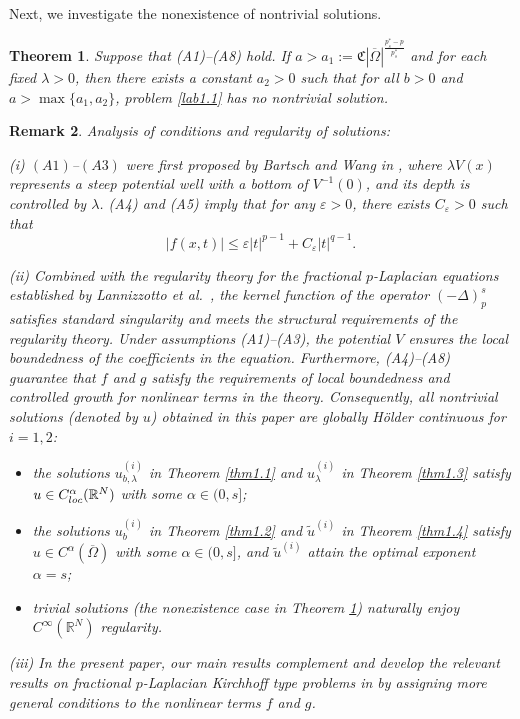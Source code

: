 \documentclass[10pt,a4paper]{amsart}
\numberwithin{equation}{section}
\newtheorem{theorem}{Theorem}[section]
\newtheorem{remark}[theorem]{Remark}
\begin{document}
Next, we investigate the nonexistence of nontrivial solutions.

\begin{theorem} \label{thm1.5}
Suppose that {\rm (A1)--(A8)}  hold.
If $a>a_1:=\mathfrak{C}|\overline{\Omega}|^{\frac{p^*_s-p}{p^*_s}}$ and for each 
fixed $\lambda>0$, then there exists a constant $a_2>0$ such that for all $b>0$ and 
$a>\max\{a_1, a_2\}$, problem \eqref{lab1.1} has no nontrivial solution.
\end{theorem}

\begin{remark}  \label{rmk1.6} \rm
Analysis of conditions and regularity of solutions:

(i) $(A1)$--$(A3)$ were first proposed by Bartsch and Wang in \cite{r2},
where $\lambda V(x)$ represents a steep potential well with a bottom of $V^{-1}(0)$, 
and its depth is controlled by $\lambda$.  (A4) and (A5) imply that for any
$\varepsilon> 0$, there exists $C_\varepsilon > 0$ such that
\begin{equation}\label{lab1.6}
|f(x,t)|\leq \varepsilon|t|^{p-1}+C_\varepsilon|t|^{q-1}.
\end{equation}

(ii) Combined with the regularity theory for the fractional $p$-Laplacian equations 
established by Lannizzotto et al.\ \cite{r11, r12}, the kernel function of the operator 
$(-\Delta)_p^s$ satisfies standard singularity and meets the structural requirements 
of the regularity theory. Under assumptions (A1)--(A3), the potential
$V$ ensures the local boundedness of the coefficients in the equation. 
Furthermore, (A4)--(A8) guarantee that $f$ and $g$ satisfy the requirements of
local boundedness and controlled growth for nonlinear terms in the theory. 
Consequently, all nontrivial solutions (denoted by $u$) obtained in this paper are 
globally H\"{o}lder continuous for $i=1,2$:
\begin{itemize}
\item the solutions $u_{b,\lambda}^{(i)}$ in Theorem \ref{thm1.1} and 
 $u_{\lambda}^{(i)}$ in Theorem \ref{thm1.3} satisfy 
 $u\in C^{\alpha}_{\rm loc}(\mathbb{R}^N)$ with some $\alpha\in(0, s]$;
 
\item the solutions $u_{b}^{(i)}$ in Theorem \ref{thm1.2} and $\widetilde{u}^{(i)}$ 
 in Theorem \ref{thm1.4} satisfy $u\in C^{\alpha}(\overline{\Omega})$ with some 
 $\alpha\in(0, s]$, and $\widetilde{u}^{(i)}$ attain the optimal exponent $\alpha=s$;

\item trivial solutions (the nonexistence case in Theorem \ref{thm1.5}) naturally 
enjoy $C^\infty(\mathbb{R}^N)$ regularity.
\end{itemize}

(iii) In the present paper, our main results complement and develop the relevant 
results on fractional $p$-Laplacian Kirchhoff type problems in \cite{r19, r26, r31, r33} 
by assigning more general conditions to the nonlinear terms $f$ and $g$.
\end{remark}
\end{document}
